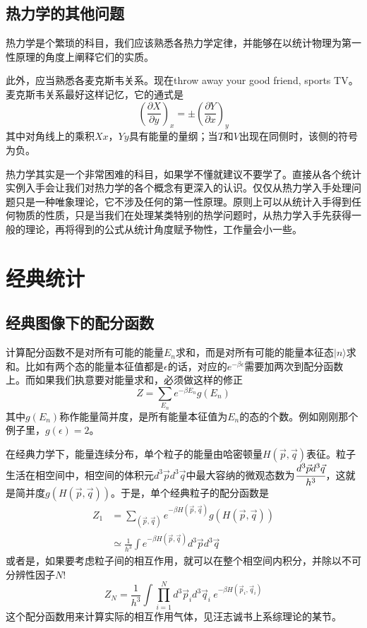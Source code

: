 \documentclass[a4paper,11pt]{ctexart}
\newcommand{\beq}{\begin{equation}}
\newcommand{\eeq}{\end{equation}}
\newcommand{\bea}{\begin{equation}\begin{aligned}}
\newcommand{\eea}{\end{aligned}\end{equation}}
\def\pfrac#1#2#3{\left(\frac{\partial #1}{\partial #2}\right)_{#3}}
\begin{document}
\subsection{热力学的其他问题}
热力学是个繁琐的科目，我们应该熟悉各热力学定律，并能够在以统计物理为第一性原理的角度上阐释它们的实质。
\par
此外，应当熟悉各麦克斯韦关系。现在throw away your good friend, sports TV。麦克斯韦关系最好这样记忆，它的通式是
\beq
\pfrac{X}{y}{x} = \pm \pfrac{Y}{x}{y}
\eeq
其中对角线上的乘积$Xx$，$Yy$具有能量的量纲；当$T$和$V$出现在同侧时，该侧的符号为负。
\par
热力学其实是一个非常困难的科目，如果学不懂就建议不要学了。直接从各个统计实例入手会让我们对热力学的各个概念有更深入的认识。仅仅从热力学入手处理问题只是一种唯象理论，它不涉及任何的第一性原理。原则上可以从统计入手得到任何物质的性质，只是当我们在处理某类特别的热学问题时，从热力学入手先获得一般的理论，再将得到的公式从统计角度赋予物性，工作量会小一些。

\section{经典统计}
\subsection{经典图像下的配分函数}
计算配分函数不是对所有可能的能量$E_n$求和，而是对所有可能的能量本征态$|n\rangle$求和。比如有两个态的能量本征值都是$\epsilon$的话，对应的$e^{-\beta \epsilon}$需要加两次到配分函数上。而如果我们执意要对能量求和，必须做这样的修正
\beq
Z = \sum_{E_n} e^{-\beta E_n} g(E_n)
\eeq
其中$g(E_n)$称作能量简并度，是所有能量本征值为$E_n$的态的个数。例如刚刚那个例子里，$g(\epsilon) = 2$。
\par
在经典力学下，能量连续分布，单个粒子的能量由哈密顿量$H(\vec{p},\vec{q})$表征。粒子生活在相空间中，相空间的体积元$d^3 \vec{p} d^3 \vec{q}$中最大容纳的微观态数为$\cfrac{d^3 \vec{p} d^3 \vec{q}}{h^3}$，这就是简并度$g(H(\vec{p},\vec{q}))$。于是，单个经典粒子的配分函数是
\bea
Z_1 &= \sum_{(\vec{p},\vec{q})}  e^{-\beta H(\vec{p},\vec{q})} g(H(\vec{p},\vec{q})) \\
&\simeq \frac{1}{h^3} \int e^{-\beta H(\vec{p},\vec{q})} d^3 \vec{p} d^3 \vec{q}
\eea
或者是，如果要考虑粒子间的相互作用，就可以在整个相空间内积分，并除以不可分辨性因子$N!$
\beq
Z_N = \frac{1}{h^3} \int \prod_{i=1}^N d^3 \vec{p}_i d^3 \vec{q}_i \ e^{-\beta H(\vec{p}_i,\vec{q}_i)}
\eeq
这个配分函数用来计算实际的相互作用气体，见汪志诚书上系综理论的某节。
\end{document}
